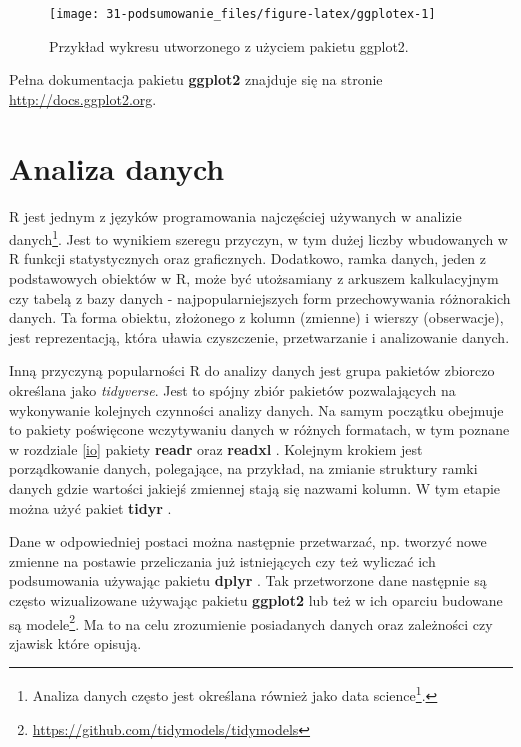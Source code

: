 \documentclass[paper=6in:9in,pagesize=pdftex,headinclude=on,footinclude=on,10pt]{scrbook}
\DeclareRobustCommand{\href}[2]{#2\footnote{\url{#1}}}
\begin{document}
\begin{figure}[H]

{\centering \texttt{[image: 31-podsumowanie\_files/figure-latex/ggplotex-1]} 

}

\caption{Przykład wykresu utworzonego z użyciem pakietu ggplot2.}\label{fig:ggplotex}
\end{figure}

Pełna dokumentacja pakietu \textbf{ggplot2} znajduje się na stronie \url{http://docs.ggplot2.org}.

\hypertarget{analiza-danych}{%
\section{Analiza danych}\label{analiza-danych}}

R jest jednym z języków programowania najczęściej używanych w analizie danych\footnote{Analiza danych często jest określana również jako \href{https://en.wikipedia.org/wiki/Data_science}{data science}.}.
Jest to wynikiem szeregu przyczyn, w tym dużej liczby wbudowanych w R funkcji statystycznych oraz graficznych.
Dodatkowo, ramka danych, jeden z podstawowych obiektów w R, może być utożsamiany z arkuszem kalkulacyjnym czy tabelą z bazy danych - najpopularniejszych form przechowywania różnorakich danych.
Ta forma obiektu, złożonego z kolumn (zmienne) i wierszy (obserwacje), jest reprezentacją, która uławia czyszczenie, przetwarzanie i analizowanie danych.

Inną przyczyną popularności R do analizy danych jest grupa pakietów zbiorczo określana jako \emph{tidyverse}.
Jest to spójny zbiór pakietów pozwalających na wykonywanie kolejnych czynności analizy danych.
Na samym początku obejmuje to pakiety poświęcone wczytywaniu danych w różnych formatach, w tym poznane w rozdziale \ref{io} pakiety \textbf{readr} \citep{R-readr} oraz \textbf{readxl} \citep{R-readxl}.
Kolejnym krokiem jest porządkowanie danych, polegające, na przykład, na zmianie struktury ramki danych gdzie wartości jakiejś zmiennej stają się nazwami kolumn.
W tym etapie można użyć pakiet \textbf{tidyr} \citep{R-tidyr}.

Dane w odpowiedniej postaci można następnie przetwarzać, np. tworzyć nowe zmienne na postawie przeliczania już istniejących czy też wyliczać ich podsumowania używając pakietu \textbf{dplyr} \citep{R-dplyr}.
Tak przetworzone dane następnie są często wizualizowane używając pakietu \textbf{ggplot2} \citep{R-ggplot2} lub też w ich oparciu budowane są \href{https://github.com/tidymodels/tidymodels}{modele}.
Ma to na celu zrozumienie posiadanych danych oraz zależności czy zjawisk które opisują.
\end{document}
